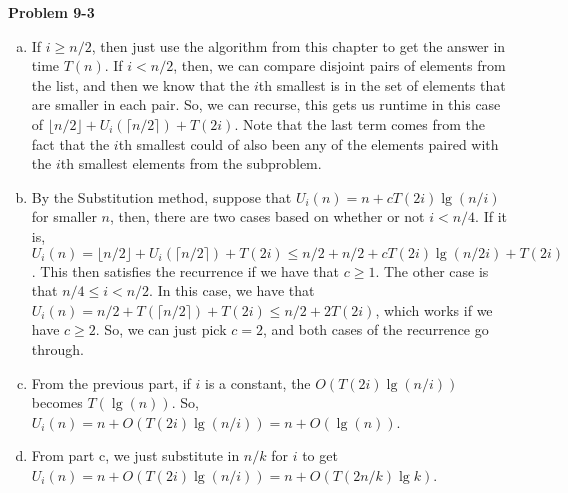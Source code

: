 \documentclass{article}
\begin{document}
\noindent\textbf{ Problem 9-3} \\
\begin{enumerate}[a.]
\item
If $i\ge n/2$, then just use the algorithm from this chapter to get the answer in time $T(n)$. If $i<n/2$, then, we can compare disjoint pairs of elements from the list, and then we know that the $i$th smallest is in the set of elements that are smaller in each pair. So, we can recurse, this gets us runtime in this case of $\lfloor n/2 \rfloor + U_i(\lceil n/2 \rceil)+T(2i)$. Note that the last term comes from the fact that the $i$th smallest could of also been any of the elements paired with the $i$th smallest elements from the subproblem. 


\item
By the Substitution method, suppose that $U_i(n) = n+c T(2i)\lg(n/i)$ for smaller $n$, then, there are two cases based on whether or not $i <n/4$. If it is,  $U_i(n) = \lfloor n/2 \rfloor + U_i(\lceil n/2 \rceil) + T(2i) \le n/2 + n/2+cT(2i)\lg(n/2i) + T(2i)$. This then satisfies the recurrence if we have that $c \ge 1$. The other case is that $n/4 \le i < n/2$. In this case, we have that $U_i(n) = n/2 + T(\lceil n/2\rceil) + T(2i) \le n/2 + 2T(2i)$, which works if we have $c\ge 2$. So, we can just pick $c=2$, and both cases of the recurrence go through.


\item
From the previous part, if $i$ is a constant, the $O(T(2i)\lg(n/i))$ becomes $T(\lg(n))$. So, $U_i(n) = n+ O(T(2i)\lg(n/i)) = n + O(\lg(n))$.

\item
From part c, we just substitute in $n/k$ for $i$ to get $U_i(n) = n+ O(T(2i)\lg(n/i)) = n + O(T(2n/k) \lg k)$.



\end{enumerate}
\end{document}
